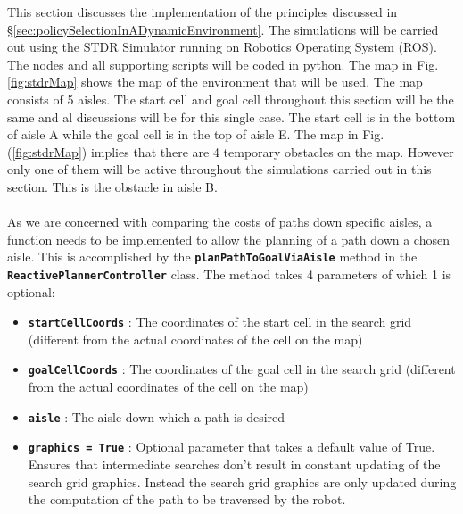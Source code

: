 \documentclass[a4paper,12pt]{article}
\begin{document}
		This section discusses the implementation of the principles discussed in \S \ref{sec:policySelectionInADynamicEnvironment}. The simulations will be carried out using the STDR Simulator running on Robotics Operating System (ROS). The nodes and all supporting scripts will be coded in python. The map in Fig. \ref{fig:stdrMap} shows the map of the environment that will be used. The map consists of 5 aisles. The start cell and goal cell throughout this section will be the same and al discussions will be for this single case. The start cell is in the bottom of aisle A while the goal cell is in the top of aisle E. The map in Fig. (\ref{fig:stdrMap}) implies that there are 4 temporary obstacles on the map. However only one of them will be active throughout the simulations carried out in this section. This is the obstacle in aisle B.
		\\
		\\
		As we are concerned with comparing the costs of paths down specific aisles, a function needs to be implemented to allow the planning of a path down a chosen aisle. This is accomplished by the \texttt{\textbf{planPathToGoalViaAisle}} method in the \texttt{\textbf{ReactivePlannerController}} class. The method takes 4 parameters of which 1 is optional:
		\begin{itemize}
			\item \textbf{\texttt{startCellCoords}} : The coordinates of the start cell in the search grid (different from the actual coordinates of the cell on the map)
			\item \textbf{\texttt{goalCellCoords}} : The coordinates of the goal cell in the search grid (different from the actual coordinates of the cell on the map)
			\item \textbf{\texttt{aisle}} : The aisle down which a path is desired
			\item \textbf{\texttt{graphics = True}} : Optional parameter that takes a default value of True. Ensures that intermediate searches don't result in constant updating of the search grid graphics. Instead the search grid graphics are only updated during the computation of the path to be traversed by the robot. 
		\end{itemize} 
		
\end{document}
